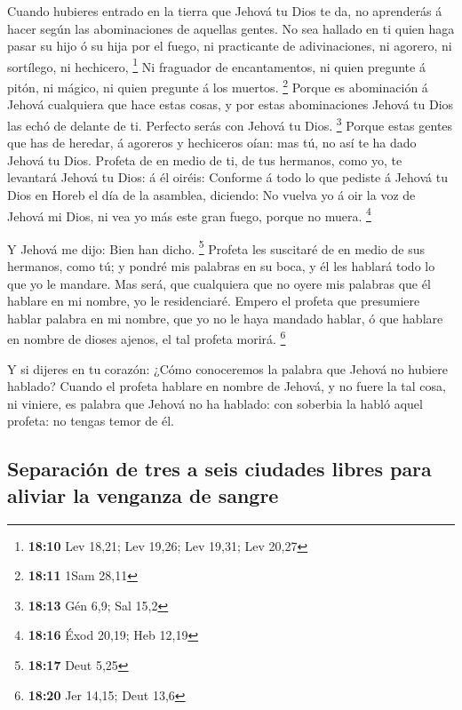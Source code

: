  Cuando hubieres entrado en la tierra que Jehová tu Dios
te da, no aprenderás á hacer según las abominaciones de aquellas gentes.
 No sea hallado en ti quien haga pasar su hijo ó su hija
por el fuego, ni practicante de adivinaciones, ni agorero, ni sortílego,
ni hechicero, \footnote{\textbf{18:10} Lev 18,21; Lev 19,26; Lev 19,31;
  Lev 20,27}  Ni fraguador de encantamentos, ni quien
pregunte á pitón, ni mágico, ni quien pregunte á los muertos.
\footnote{\textbf{18:11} 1Sam 28,11}  Porque es
abominación á Jehová cualquiera que hace estas cosas, y por estas
abominaciones Jehová tu Dios las echó de delante de ti. 
Perfecto serás con Jehová tu Dios. \footnote{\textbf{18:13} Gén 6,9; Sal
  15,2}  Porque estas gentes que has de heredar, á
agoreros y hechiceros oían: mas tú, no así te ha dado Jehová tu Dios.
 Profeta de en medio de ti, de tus hermanos, como yo, te
levantará Jehová tu Dios: á él oiréis:  Conforme á todo
lo que pediste á Jehová tu Dios en Horeb el día de la asamblea,
diciendo: No vuelva yo á oir la voz de Jehová mi Dios, ni vea yo más
este gran fuego, porque no muera. \footnote{\textbf{18:16} Éxod 20,19;
  Heb 12,19}

 Y Jehová me dijo: Bien han dicho. \footnote{\textbf{18:17}
  Deut 5,25}  Profeta les suscitaré de en medio de sus
hermanos, como tú; y pondré mis palabras en su boca, y él les hablará
todo lo que yo le mandare.  Mas será, que cualquiera que
no oyere mis palabras que él hablare en mi nombre, yo le residenciaré.
 Empero el profeta que presumiere hablar palabra en mi
nombre, que yo no le haya mandado hablar, ó que hablare en nombre de
dioses ajenos, el tal profeta morirá. \footnote{\textbf{18:20} Jer
  14,15; Deut 13,6}

 Y si dijeres en tu corazón: ¿Cómo conoceremos la palabra
que Jehová no hubiere hablado?  Cuando el profeta hablare
en nombre de Jehová, y no fuere la tal cosa, ni viniere, es palabra que
Jehová no ha hablado: con soberbia la habló aquel profeta: no tengas
temor de él.

\hypertarget{separaciuxf3n-de-tres-a-seis-ciudades-libres-para-aliviar-la-venganza-de-sangre}{%
\subsection{Separación de tres a seis ciudades libres para aliviar la
venganza de
sangre}\label{separaciuxf3n-de-tres-a-seis-ciudades-libres-para-aliviar-la-venganza-de-sangre}}

